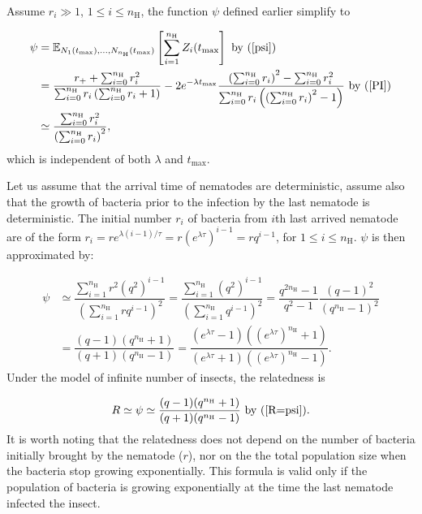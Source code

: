 \documentclass{article}
\newcommand{\nN}{{n_\textrm{H}}}
\begin{document}
 Assume $r_i \gg 1$, $ 1 \leq i \leq \nN $, the function $\psi$ defined earlier simplify to 
 
 \begin{align}
 \psi &={\mathbb E}_{N_1(t_{\mathrm{max}}), \hdots, N_\nN(t_{\mathrm{max}}) } \left[ \displaystyle  \sum_{i=1}^\nN Z_i(t_{\mathrm{max}} \right] \text{ by } (\ref{psi}) \\
 &= \dfrac{ r_+ + \sum_{i=0}^\nN r_i^2}{\sum_{i=0}^\nN r_i \left(\sum_{i=0}^\nN r_i +1\right) }  -2 e^{-\lambda t_{\mathrm{max}}} \dfrac{ \left(\sum_{i=0}^\nN r_i\right)^2-\sum_{i=0}^\nN r_i^2}{\sum_{i=0}^\nN r_i \left( \left(\sum_{i=0}^\nN r_i\right)^2 -1\right) } \text{ by } (\ref{PI}) \\
 & \simeq \dfrac{ \sum_{i=0}^\nN r_i^2}{\left(\sum_{i=0}^\nN r_i\right)^2}, \label{simplify:relatedness}
 \end{align}
 which is independent of both $\lambda$ and $t_{\mathrm{max}}$.
 
 
 Let us assume that the arrival time of nematodes are deterministic, assume also that the growth of bacteria prior to the infection by the last nematode is deterministic. The initial number $r_i$ of bacteria from $i$th last arrived nematode are of the form $r_i=r e^{\lambda  (i-1)/ \tau}=r (e^{ \lambda \tau })^{i-1}=r q^{i-1}$, for $ 1 \leq i \leq \nN$.
 $\psi$ is then approximated by: 
 
 \begin{align}
  \psi &\simeq \dfrac{ \sum_{i=1}^\nN r^2 (q^2)^{i-1}}{\left(\sum_{i=1}^\nN r q^{i-1}\right)^2} = \dfrac{ \sum_{i=1}^\nN (q^2)^{i-1}}{\left(\sum_{i=1}^\nN q^{i-1}\right)^2}= \dfrac{q^{2\nN} -1 }{q^{2} -1 } \dfrac{(q-1)^2}{(q^\nN -1)^2} \\
  &= \dfrac{(q-1)(q^\nN +1)}{(q+1)(q^\nN -1)} = \dfrac{(e^{  \lambda \tau}-1)((e^{\lambda\tau})^\nN +1)}{(e^{\lambda\tau}+1)((e^{\lambda\tau})^\nN -1)}.
 \end{align}
 Under the model of infinite number of insects, the relatedness is 
 
 \begin{equation}
 R \simeq \psi \simeq  \dfrac{(q-1)(q^\nN +1)}{(q+1)(q^\nN -1)} \text{ by }(\ref{R=psi}).
 \end{equation}
 It is worth noting that the relatedness does not depend on the number of bacteria initially brought by the nematode ($r$), nor on the the total population size when the bacteria stop growing exponentially. 
 This formula is valid only if the population of bacteria is growing exponentially at the time the last nematode infected the insect.
 
\end{document}
